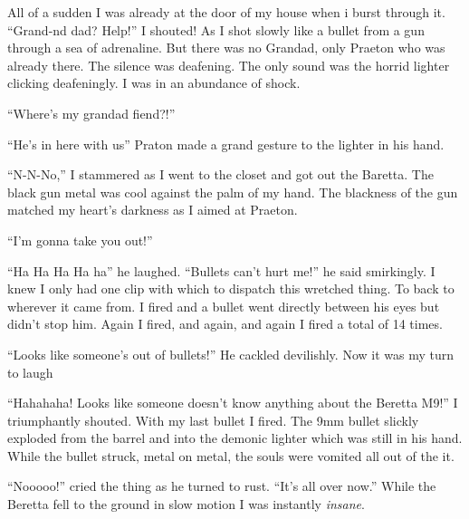 All of a sudden I was already at the door of my house when i burst
through it. ``Grand-nd dad? Help!'' I shouted! As I shot slowly like
a bullet from a gun through a sea of adrenaline. But there was no
Grandad, only Praeton who was already there. The silence was
deafening. The only sound was the horrid lighter clicking
deafeningly. I was in an abundance of shock.



``Where's my grandad fiend?!''



``He's in here with us'' Praton made a grand gesture to the lighter
in his hand.



``N-N-No,'' I stammered as I went to the closet and got out the
Baretta. The black gun metal was cool against the palm of my hand.
The blackness of the gun matched my heart's darkness as I aimed at
Praeton.

``I'm gonna take you out!''

``Ha Ha Ha Ha ha'' he laughed. ``Bullets can't hurt me!'' he said
smirkingly. I knew I only had one clip with which to dispatch this
wretched thing. To back to wherever it came from. I fired and a
bullet went directly between his eyes but didn't stop him. Again I
fired, and again, and again I fired a total of 14 times.



``Looks like someone's out of bullets!'' He cackled devilishly. Now
it was my turn to laugh



``Hahahaha! Looks like someone doesn't know anything about the
Beretta M9!'' I triumphantly shouted. With my last bullet I fired.
The 9mm bullet slickly exploded from the barrel and into the
demonic lighter which was still in his hand. While the bullet
struck, metal on metal, the souls were vomited all out of the
it.



``Nooooo!'' cried the thing as he turned to rust. ``It's all over
now.'' While the Beretta fell to the ground in slow motion I was
instantly {\em insane}. 
 




